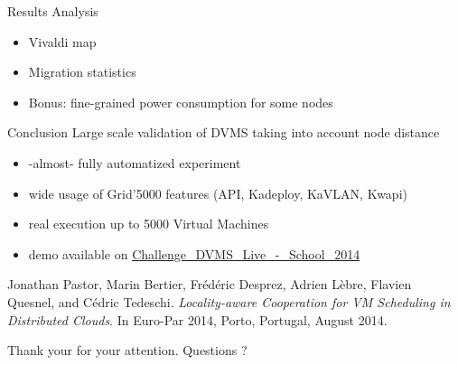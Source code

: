 \documentclass{beamer}
\begin{document}
\begin{frame}{Results Analysis}
\begin{itemize}
    \item Vivaldi map
    \item Migration statistics
    \item Bonus: fine-grained power consumption for some nodes
\end{itemize}
\end{frame}

\begin{frame}{Conclusion}
Large scale validation of DVMS taking into account node distance
\begin{itemize}
    \item -almost- fully automatized experiment
    \item wide usage of Grid'5000 features (API, Kadeploy, KaVLAN, Kwapi)
    \item real execution up to 5000 Virtual Machines
    \item demo available on \href{https://www.grid5000.fr/mediawiki/index.php/Challenge_DVMS_Live_-_School_2014}
    {Challenge\_DVMS\_Live\_-\_School\_2014}
\end{itemize}

\begin{block}{}
\small
Jonathan Pastor, Marin Bertier, Frédéric Desprez, Adrien Lèbre, Flavien Quesnel, 
and Cédric Tedeschi. \textit{Locality-aware Cooperation for VM Scheduling in 
Distributed Clouds}. In Euro-Par 2014, Porto, Portugal, August 2014.
\end{block}
\end{frame}

\begin{frame}
Thank your for your attention. Questions ?
\end{frame}
\end{document}
